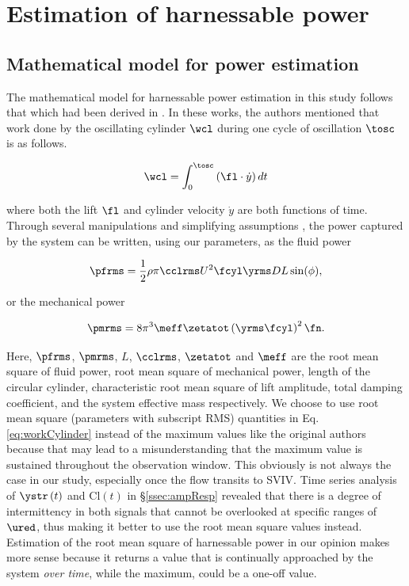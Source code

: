 \documentclass[a4paper,fleqn]{cas-sc}
\begin{document}
\section{Estimation of harnessable power} \label{sec:estimPow}
\subsection{Mathematical model for power estimation} \label{ssec:mathModel}
The mathematical model for harnessable power estimation in this study follows that which had been derived in \citet{Raghavanetal2007}. In these works, the authors mentioned that work done by the oscillating cylinder $\wcl$ during one cycle of oscillation $\tosc$ is as follows.

\begin{equation}
  \wcl = \int_{0}^{\tosc} \left ( \fl \cdot \dot{y} \right ) dt
  \label{eq:workCylinder}
\end{equation}

\noindent where both the lift $\fl$ and cylinder velocity $\dot{y}$ are both functions of time. Through several manipulations and simplifying assumptions \citep{Sun2016}, the power captured by the system can be written, using our parameters, as the fluid power

\begin{equation}
  \pfrms = \frac{1}{2} \rho \pi \cclrms U^{2} \fcyl \yrms D L \sin(\phi),
  \label{eq:rmsFluidPower}
\end{equation}

\noindent or the mechanical power

\begin{equation}
  \pmrms = 8 \pi^{3} \meff \zetatot \left (\yrms \fcyl \right )^{2} \fn.
  \label{eq:rmsMechPower}
\end{equation}

Here, $\pfrms$, $\pmrms$, $L$, $\cclrms$, $\zetatot$ and $\meff$ are the root mean square of fluid power, root mean square of mechanical power, length of the circular cylinder, characteristic root mean square of lift amplitude, total damping coefficient, and the system effective mass respectively. We choose to use root mean square (parameters with subscript RMS) quantities in Eq. \ref{eq:workCylinder} instead of the maximum values like the original authors because that may lead to a misunderstanding that the maximum value is sustained throughout the observation window. This obviously is not always the case in our study, especially once the flow transits to SVIV. Time series analysis of $\ystr\left( t \right)$ and $\text{Cl}\left( t \right)$ in \S\ref{ssec:ampResp} revealed that there is a degree of intermittency in both signals that cannot be overlooked at specific ranges of $\ured$, thus making it better to use the root mean square values instead. Estimation of the root mean square of harnessable power in our opinion makes more sense because it returns a value that is continually approached by the system \textit{over time}, while the maximum, could be a one-off value.
\end{document}
